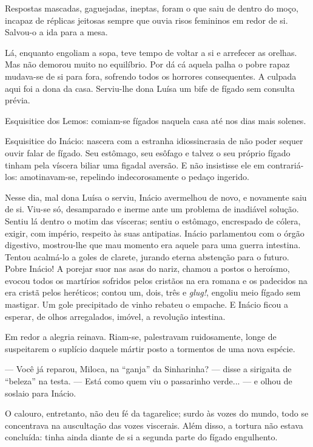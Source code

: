 Respostas mascadas, gaguejadas, ineptas, foram o que saiu de dentro do
moço, incapaz de réplicas jeitosas sempre que ouvia risos femininos em
redor de si. Salvou-o a ida para a mesa.

Lá, enquanto engoliam a sopa, teve tempo de voltar a si e arrefecer as
orelhas. Mas não demorou muito no equilíbrio. Por dá cá aquela palha o
pobre rapaz mudava-se de si para fora, sofrendo todos os horrores
consequentes. A culpada aqui foi a dona da casa. Serviu-lhe dona Luísa
um bife de fígado sem consulta prévia.

Esquisitice dos Lemos: comiam-se fígados naquela casa até nos dias mais
solenes.

Esquisitice do Inácio: nascera com a estranha idiossincrasia de não
poder sequer ouvir falar de fígado. Seu estômago, seu esôfago e talvez o
seu próprio fígado tinham pela víscera biliar uma figadal aversão. E não
insistisse ele em contrariá-los: amotinavam-se, repelindo
indecorosamente o pedaço ingerido.

Nesse dia, mal dona Luísa o serviu, Inácio avermelhou de novo, e
novamente saiu de si. Viu-se só, desamparado e inerme ante um problema
de inadiável solução. Sentiu lá dentro o motim das vísceras; sentiu o
estômago, encrespado de cólera, exigir, com império, respeito às suas
antipatias. Inácio parlamentou com o órgão digestivo, mostrou-lhe que
mau momento era aquele para uma guerra intestina. Tentou acalmá-lo a
goles de clarete, jurando eterna abstenção para o futuro. Pobre Inácio!
A porejar suor nas asas do nariz, chamou a postos o heroísmo, evocou
todos os martírios sofridos pelos cristãos na era romana e os padecidos
na era cristã pelos heréticos; contou um, dois, três e \emph{glug!},
engoliu meio fígado sem mastigar. Um gole precipitado de vinho rebateu o
empache. E Inácio ficou a esperar, de olhos arregalados, imóvel, a
revolução intestina.

Em redor a alegria reinava. Riam-se, palestravam ruidosamente, longe de
suspeitarem o suplício daquele mártir posto a tormentos de uma nova
espécie.

--- Você já reparou, Miloca, na ``ganja'' da Sinharinha? --- disse a
sirigaita de ``beleza'' na testa. --- Está como quem viu o passarinho
verde... --- e olhou de soslaio para Inácio.

O calouro, entretanto, não deu fé da tagarelice; surdo às vozes do
mundo, todo se concentrava na auscultação das vozes viscerais. Além
disso, a tortura não estava concluída: tinha ainda diante de si a
segunda parte do fígado engulhento.

